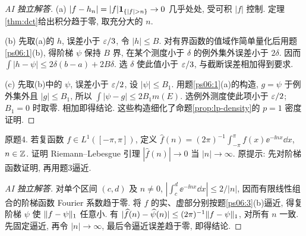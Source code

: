 \begin{proof}[AI 独立解答]
(a) $|f-h_n|=|f|\ind_{\{|f|>n\}}\to0$ 几乎处处, 受可积 $|f|$ 控制. 定理\ref{thm:dct}给出积分趋于零, 取充分大的 $n$.

(b) 先取(a)的 $h$, 误差小于 $\varepsilon/3$, 令 $|h|\le B$. 对有界函数的值域作简单量化后用题\ref{ps06:1}(b), 得阶梯 $\psi$ 保持 $B$ 界, 在某个测度小于 $\delta$ 的例外集外误差小于 $2\delta$. 因而 $\int|h-\psi|\le2\delta(b-a)+2B\delta$. 选 $\delta$ 使此值小于 $\varepsilon/3$, 与截断误差相加得到要求.

(c) 先取(b)中的 $\psi$, 误差小于 $\varepsilon/2$, 设 $|\psi|\le B_1$. 用题\ref{ps06:1}(a)的构造, $g=\psi$ 于例外集外且 $|g|\le B_1$, 所以 $\int|\psi-g|\le2B_1m(E)$. 选例外测度使此项小于 $\varepsilon/2$; $B_1=0$ 时取零. 相加即得结论. 这些构造细化了命题\ref{prop:lp-density}的 $p=1$ 密度证明.
\end{proof}
\begin{exercise}\label{ps06:4}
原题4. 若复函数 $f\in L^1([-\pi,\pi])$, 定义 $\widehat f(n)=(2\pi)^{-1}\int_{-\pi}^{\pi}f(x)\ee^{-\ii nx}\dd x$, $n\in\mathbb Z$. 证明 Riemann--Lebesgue 引理 $|\widehat f(n)|\to0$ 当 $|n|\to\infty$. 原提示: 先对阶梯函数证明, 再用题3逼近.
\end{exercise}
\begin{proof}[AI 独立解答]
对单个区间 $(c,d)$ 及 $n\ne0$, $\left|\int_c^d\ee^{-\ii nx}\dd x\right|\le2/|n|$, 因而有限线性组合的阶梯函数 Fourier 系数趋于零. 将 $f$ 的实、虚部分别按题\ref{ps06:3}(b)逼近, 得复阶梯 $\psi$ 使 $\lVert f-\psi\rVert_1$ 任意小. 有 $|\widehat f(n)-\widehat\psi(n)|\le(2\pi)^{-1}\lVert f-\psi\rVert_1$, 对所有 $n$ 一致. 先固定逼近, 再令 $|n|\to\infty$, 最后令逼近误差趋于零, 即得结论.
\end{proof}
